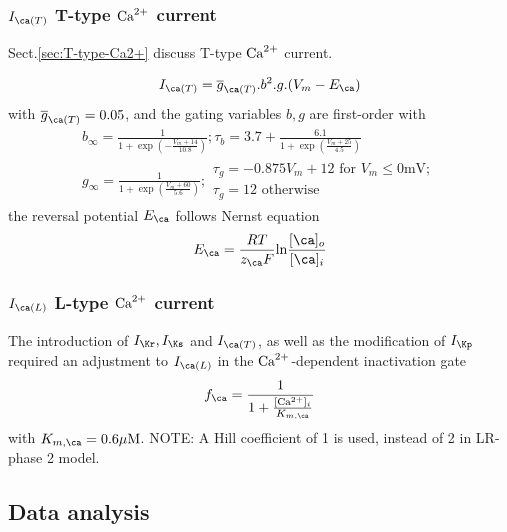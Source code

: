 \subsubsection{$I_{\ca(T)}$ T-type ${\text{Ca}^{2+}}$ current}

Sect.\ref{sec:T-type-Ca2+} discuss T-type ${\text{Ca}^{2+}}$ current.

\begin{equation}
  \label{eq:1301}
  I_{\ca(T)} =\overline{g}_{\ca(T)} .b^2.g.(V_m-E_\ca)
\end{equation}
with $\overline{g}_{\ca(T)} = 0.05$, and the gating variables $b,g$ are
first-order with
\begin{equation}
  \label{eq:1302}
  \begin{split}
    b_\infty = \frac{1}{1+\exp(-\frac{V_m+14}{10.8})}; \tau_b = 3.7+\frac{6.1}{1+\exp(\frac{V_m+25}{4.5})} \\
    g_\infty = \frac{1}{1+\exp(\frac{V_m+60}{5.6})};
    \begin{array}{l}
      \tau_g =
      -0.875V_m+12 \text{ for } V_m\le 0 \text{mV};  \\
      \tau_g =
      12 \text{ otherwise}
    \end{array}
  \end{split}
\end{equation}
the reversal potential $E_\ca$ follows Nernst equation
\begin{equation}
  \label{eq:1303}
  E_\ca = \frac{RT}{z_\ca F}\ln\frac{[\ca]_o}{[\ca]_i}
\end{equation}

\subsubsection{$I_{\ca(L)}$ L-type ${\text{Ca}^{2+}}$ current}
\label{sec:i_cal-l-type}

The introduction of $I_\Kr, I_\Ks$ and $I_{\ca(T)}$, as well as the
modification of $I_\Kp$ required an adjustment to $I_{\ca(L)}$ in the
${\text{Ca}^{2+}}$-dependent inactivation gate
\begin{equation}
  \label{eq:1304}
  f_\ca = \frac{1}{1+\frac{[\Ca]_i}{K_{m,\ca}}}
\end{equation}
with $K_{m,\ca}=0.6\muM$. NOTE: A Hill coefficient of 1 is used,
instead of 2 in LR-phase 2 model. 

\subsection{Data analysis}

